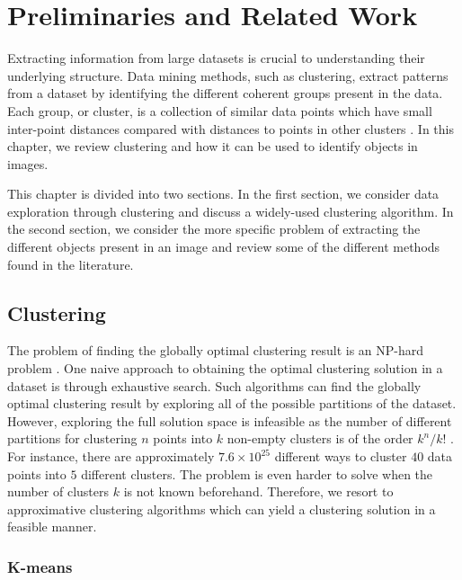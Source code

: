 \chapter{Preliminaries and Related Work}\label{chapter:preliminaries_and_related_works}

Extracting information from large datasets is crucial to understanding their underlying structure. Data mining methods, such as clustering, extract patterns from a dataset by identifying the different coherent groups present in the data. Each group, or cluster, is a collection of similar data points which have small inter-point distances compared with distances to points in other clusters \parencite{bishop2006pattern}. In this chapter, we review clustering and how it can be used to identify objects in images.

This chapter is divided into two sections. In the first section, we consider data exploration through clustering and discuss a widely-used clustering algorithm. In the second section, we consider the more specific problem of extracting the different objects present in an image and review some of the different methods found in the literature.

\section{Clustering}

The problem of finding the globally optimal clustering result is an NP-hard problem \parencite{ayramo2006introduction}. One naive approach to obtaining the optimal clustering solution in a dataset is through exhaustive search. Such algorithms can find the globally optimal clustering result by exploring all of the possible partitions of the dataset. However, exploring the full solution space is infeasible as the number of different partitions for clustering $n$ points into $k$ non-empty clusters is of the order $k^n/k!$ \parencite{kaufman}. For instance, there are approximately $7.6 \times 10^{25}$ different ways to cluster $40$ data points into $5$ different clusters. The problem is even harder to solve when the number of clusters $k$ is not known beforehand. Therefore, we resort to approximative clustering algorithms which can yield a clustering solution in a feasible manner.

\subsection{K-means}\label{section:k-means}

